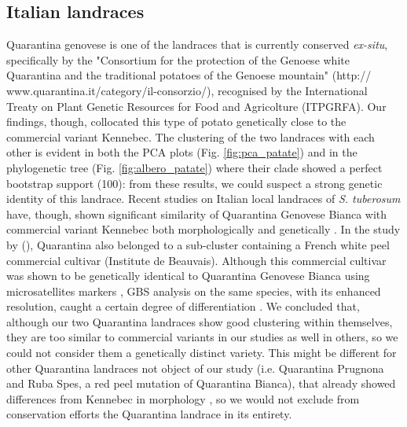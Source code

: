 \documentclass[a4paper, 12pt]{report}
\begin{document}
\subsection{Italian landraces}
Quarantina genovese is one of the landraces that is currently conserved \textit{ex-situ}, specifically by the "Consortium for the protection of the Genoese white Quarantina and the traditional potatoes of the Genoese mountain" (http://
www.quarantina.it/category/il-consorzio/), recognised by the International Treaty on Plant Genetic Resources for Food and Agricolture (ITPGRFA). Our findings, though, collocated this type of potato genetically close to the commercial variant Kennebec. The clustering of the two landraces with each other is evident in both the PCA plots (Fig. \ref{fig:pca_patate}) and in the phylogenetic tree (Fig. \ref{fig:albero_patate}) where their clade showed a perfect bootstrap support (100): from these results, we could suspect a strong genetic identity of this landrace. Recent studies on Italian local landraces of \textit{S. tuberosum} have, though, shown significant similarity of Quarantina Genovese Bianca with commercial variant Kennebec both morphologically \parencite{giupponiMorphometricPhytochemicalCharacterization2020} and genetically \parencite{martinaConservationValorizationItalian2025}. In the study by \citeauthor{martinaConservationValorizationItalian2025} (\citeyear{martinaConservationValorizationItalian2025}), Quarantina also belonged to a sub-cluster containing a French white peel commercial cultivar (Institute de Beauvais). Although this commercial cultivar was shown to be genetically identical to Quarantina Genovese Bianca using microsatellites markers \parencite{mandolinoMOLECULARFINGERPRINTINGTRADITIONAL2015}, GBS analysis on the same species, with its enhanced resolution, caught a certain degree of differentiation \parencite{martinaConservationValorizationItalian2025}. We concluded that, although our two Quarantina landraces show good clustering within themselves, they are too similar to commercial variants in our studies as well in others, so we could not consider them a genetically distinct variety. This might be different for other Quarantina landraces not object of our study (i.e. Quarantina Prugnona and Ruba Spes, a red peel mutation of Quarantina Bianca), that already showed differences from Kennebec in morphology \parencite{giupponiMorphometricPhytochemicalCharacterization2020}, so we would not exclude from conservation efforts the Quarantina landrace in its entirety.
\end{document}

